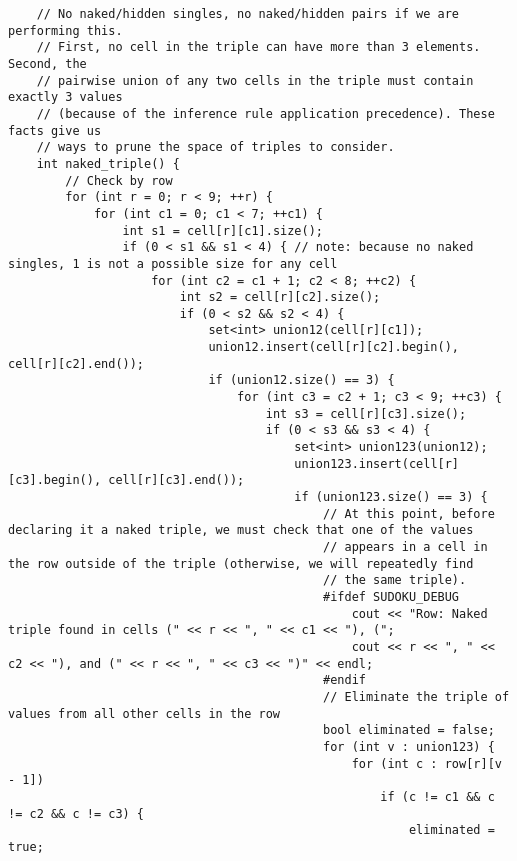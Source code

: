 \documentclass{article}
\begin{document}
\begin{lstlisting}
    // No naked/hidden singles, no naked/hidden pairs if we are performing this.
    // First, no cell in the triple can have more than 3 elements. Second, the
    // pairwise union of any two cells in the triple must contain exactly 3 values
    // (because of the inference rule application precedence). These facts give us
    // ways to prune the space of triples to consider.
    int naked_triple() {
        // Check by row
        for (int r = 0; r < 9; ++r) {
            for (int c1 = 0; c1 < 7; ++c1) {
                int s1 = cell[r][c1].size();
                if (0 < s1 && s1 < 4) { // note: because no naked singles, 1 is not a possible size for any cell
                    for (int c2 = c1 + 1; c2 < 8; ++c2) {
                        int s2 = cell[r][c2].size();
                        if (0 < s2 && s2 < 4) {
                            set<int> union12(cell[r][c1]);
                            union12.insert(cell[r][c2].begin(), cell[r][c2].end());
                            if (union12.size() == 3) {
                                for (int c3 = c2 + 1; c3 < 9; ++c3) {
                                    int s3 = cell[r][c3].size();
                                    if (0 < s3 && s3 < 4) {
                                        set<int> union123(union12);
                                        union123.insert(cell[r][c3].begin(), cell[r][c3].end());
                                        if (union123.size() == 3) {
                                            // At this point, before declaring it a naked triple, we must check that one of the values
                                            // appears in a cell in the row outside of the triple (otherwise, we will repeatedly find
                                            // the same triple).
                                            #ifdef SUDOKU_DEBUG
                                                cout << "Row: Naked triple found in cells (" << r << ", " << c1 << "), (";
                                                cout << r << ", " << c2 << "), and (" << r << ", " << c3 << ")" << endl;
                                            #endif
                                            // Eliminate the triple of values from all other cells in the row
                                            bool eliminated = false;
                                            for (int v : union123) {
                                                for (int c : row[r][v - 1])
                                                    if (c != c1 && c != c2 && c != c3) {
                                                        eliminated = true;

\end{lstlisting}
\end{document}
